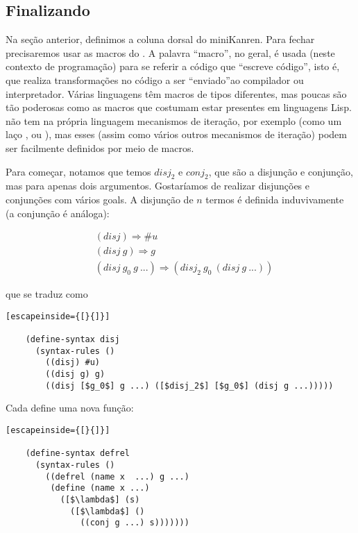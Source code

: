 \documentclass{article}
\begin{document}


  \subsection{Finalizando}

  Na seção anterior, definimos a coluna dorsal do miniKanren. Para
  fechar precisaremos usar as macros do . A palavra
  ``macro'', no geral, é usada (neste contexto de programação) para se
  referir a código que ``escreve código'', isto é, que realiza
  transformações no código a ser ``enviado''ao compilador ou
  interpretador. Várias linguagens têm macros de tipos diferentes, mas
  poucas são tão poderosas como as macros que costumam estar presentes
  em linguagens Lisp.  não tem na própria linguagem
  mecanismos de iteração, por exemplo (como um laço ,
  ou ), mas esses (assim como vários outros
  mecanismos de iteração) podem ser facilmente definidos por meio de
  macros.

  Para começar, notamos que temos $disj_2$ e $conj_2$, que são a
  disjunção e conjunção, mas para apenas dois argumentos. Gostaríamos
  de realizar disjunções e conjunções com vários goals. A disjunção de
  $n$ termos é definida induvivamente (a conjunção é análoga):

  \begin{align*}
    &(disj) \Rightarrow \#u \\
    &(disj\ g) \Rightarrow g \\
    &(disj\ g_0\ g\ ...) \Rightarrow (disj_2\ g_0\ (disj\ g\ ...))
  \end{align*}

  \noindent que se traduz como

  \begin{lstlisting}[escapeinside={[}{]}]

    (define-syntax disj
      (syntax-rules ()
        ((disj) #u)
        ((disj g) g)
        ((disj [$g_0$] g ...) ([$disj_2$] [$g_0$] (disj g ...)))))

  \end{lstlisting}

  Cada  define uma nova função:

  \begin{lstlisting}[escapeinside={[}{]}]

    (define-syntax defrel
      (syntax-rules ()
        ((defrel (name x  ...) g ...)
         (define (name x ...)
           ([$\lambda$] (s)
             ([$\lambda$] ()
               ((conj g ...) s)))))))

  \end{lstlisting}
             
\end{document}
